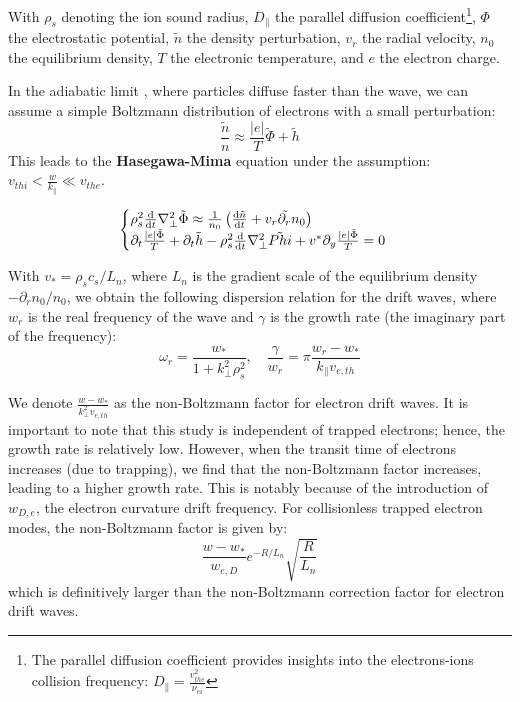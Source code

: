 \documentclass[11pt,a4paper,openany]{report}
\begin{document}
\begin{multicols}{2}
    With $\rho_s$ denoting the ion sound radius, $D_\parallel$ the parallel diffusion coefficient\footnote{The parallel diffusion coefficient provides insights into the electrons-ions collision frequency: $D_\parallel = \frac{v_{the}^2}{\nu_{ei}}$}, $\Phi$ the electrostatic potential, $\tilde{n}$ the density perturbation, $v_r$ the radial velocity, $n_0$ the equilibrium density, $T$ the electronic temperature, and $e$ the electron charge.

    In the adiabatic limit \cite{Trapped_Particle_Mode}, where particles diffuse faster than the wave, we can assume a simple Boltzmann distribution of electrons with a small perturbation:
    $$\frac{\tilde{n}}{n} \approx \frac{\vert e \vert}{T} \tilde{\Phi} + \tilde{h}$$
    This leads to the \textbf{Hasegawa-Mima} \cite{Mima} equation under the assumption: $v_{thi} < \frac{w}{k_\parallel} \ll v_{the}$.

    \begin{equation}
        \begin{cases}
            \rho_s^2\dv{t}\nabla_\perp^2\tilde{\Phi} \approx \frac{1}{n_0}\left(\dv{\tilde{n}}{t} + \tilde{v_r\partial_r n_0}\right) \\
            \partial_t \frac{\vert e \vert \tilde{\Phi}}{T} + \partial_t \tilde{h} - \rho_s^2\dv{t}\nabla_\perp^2\tilde{Phi}  + v^{*}\partial_y\frac{\vert e \vert \tilde{\Phi}}{T} = 0
        \end{cases}
    \end{equation}

    With $v_* = \rho_s c_s / L_n$, where $L_n$ is the gradient scale of the equilibrium density $-\partial_r n_0 / n_0$, we obtain the following dispersion relation for the drift waves, where $w_r$ is the real frequency of the wave and $\gamma$ is the growth rate (the imaginary part of the frequency):
    $$\omega_r = \frac{w_{*}}{1 + k_\perp^2 \rho_s^2}, \quad \frac{\gamma}{w_r} = \pi \frac{w_r - w_{*}}{k_\parallel v_{e,th}}$$

    We denote $\frac{w - w_*}{k_\perp^2 v_{e,th}}$ as the non-Boltzmann factor for electron drift waves. It is important to note that this study is independent of trapped electrons; hence, the growth rate is relatively low. However, when the transit time of electrons increases (due to trapping), we find \cite{San_diego} that the non-Boltzmann factor increases, leading to a higher growth rate. This is notably because of the introduction of $w_{D,e}$, the electron curvature drift frequency. For collisionless trapped electron modes, the non-Boltzmann factor is given by:
    $$\frac{w - w_*}{w_{e,D}} e^{-R/L_n} \sqrt{\frac{R}{L_n}}$$
    which is definitively larger than the non-Boltzmann correction factor for electron drift waves.


\end{multicols}
\end{document}
